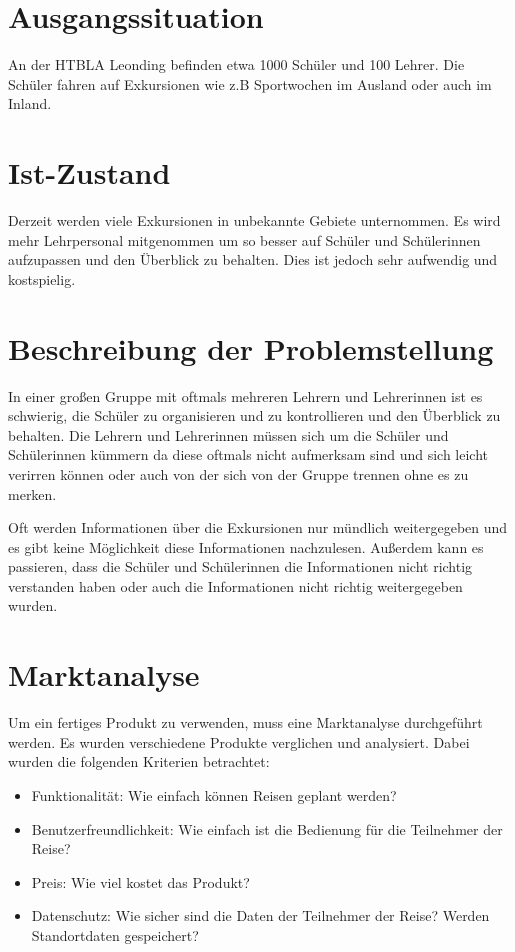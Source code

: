 \section{Ausgangssituation}
An der HTBLA Leonding befinden etwa 1000 Schüler und 100 Lehrer.
Die Schüler fahren auf Exkursionen wie z.B Sportwochen im Ausland oder auch im Inland.

\section{Ist-Zustand}
Derzeit werden viele Exkursionen in unbekannte Gebiete unternommen. Es wird mehr Lehrpersonal mitgenommen um so besser auf Schüler und Schülerinnen aufzupassen und den Überblick zu behalten. Dies ist jedoch sehr aufwendig und kostspielig. 

\section{Beschreibung der Problemstellung}
In einer großen Gruppe mit oftmals mehreren Lehrern und Lehrerinnen ist es schwierig, die Schüler zu organisieren und zu kontrollieren und  den Überblick zu behalten. Die Lehrern und Lehrerinnen müssen sich um die Schüler und Schülerinnen kümmern da diese oftmals nicht aufmerksam sind und sich leicht verirren können oder auch von der sich von der Gruppe trennen ohne es zu merken.

Oft werden Informationen über die Exkursionen nur mündlich weitergegeben und es gibt keine Möglichkeit diese Informationen nachzulesen. Außerdem kann es passieren, dass die Schüler und Schülerinnen die Informationen nicht richtig verstanden haben oder auch die Informationen nicht richtig weitergegeben wurden.

\newpage

\section{Marktanalyse}
Um ein fertiges Produkt zu verwenden, muss eine Marktanalyse durchgeführt werden. Es wurden verschiedene Produkte verglichen und analysiert. Dabei wurden die folgenden Kriterien betrachtet:
\begin{itemize}
    \item Funktionalität: Wie einfach können Reisen geplant werden? 
    \item Benutzerfreundlichkeit: Wie einfach ist die Bedienung für die Teilnehmer der Reise?
    \item Preis: Wie viel kostet das Produkt?
    \item Datenschutz: Wie sicher sind die Daten der Teilnehmer der Reise? Werden Standortdaten gespeichert?
\end{itemize}


